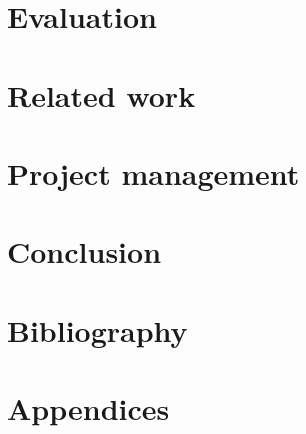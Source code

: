 \documentclass{article}
\begin{document}
\section{Evaluation}


\section{Related work}

\section{Project management}

\section{Conclusion}
\label{sec:conclusion}


\section{Bibliography}
\label{sec:biblio}

\clearpage

\section{Appendices}
\label{sec:appendix}

\end{document}
